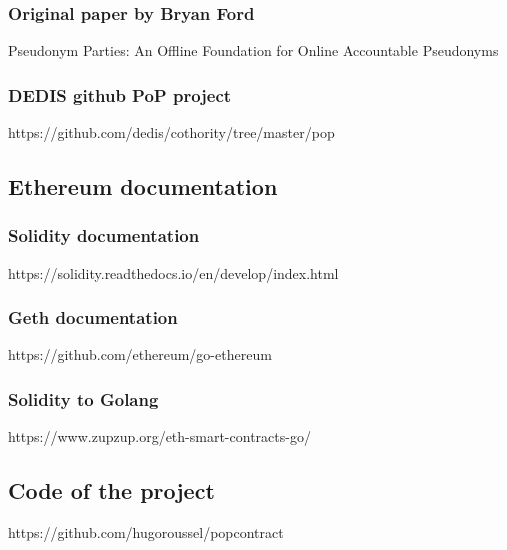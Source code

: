 \documentclass[11pt, a4paper, twoside, openright]{article} %
\begin{document}
\subsubsection*{Original paper by Bryan Ford}
Pseudonym Parties: An Offline Foundation for Online Accountable Pseudonyms
\subsubsection*{DEDIS github PoP project}
https://github.com/dedis/cothority/tree/master/pop
\subsection*{Ethereum documentation}
\subsubsection*{Solidity documentation}
https://solidity.readthedocs.io/en/develop/index.html
\subsubsection*{Geth documentation}
https://github.com/ethereum/go-ethereum
\subsubsection*{Solidity to Golang}
https://www.zupzup.org/eth-smart-contracts-go/
\subsection*{Code of the project}
https://github.com/hugoroussel/popcontract
\end{document}

